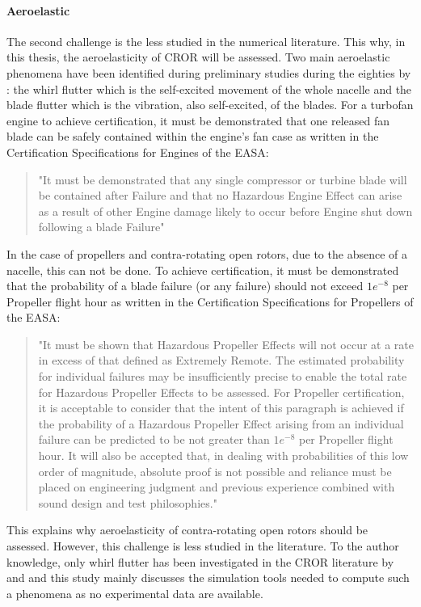 \paragraph{Aeroelastic}
The second challenge is the less studied in the numerical literature.
This why, in this thesis, the aeroelasticity of CROR will be assessed.
Two main aeroelastic phenomena have been identified during preliminary studies
during the eighties by \citet{Hager1988}: the whirl flutter which is the self-excited
movement of the whole nacelle and the blade flutter which is the vibration, also
self-excited, of the blades.
For a turbofan engine to achieve certification, it must be demonstrated that one released fan blade can be safely contained within the engine’s fan case as written in the 
Certification Specifications for Engines of the EASA:
\begin{quote}
	"It must be demonstrated that any single compressor or turbine blade will be contained after Failure and 
that no Hazardous Engine Effect can arise as a result of other Engine damage likely to occur before 
Engine shut down following a blade Failure"
\end{quote}
In the case of propellers and contra-rotating open rotors, due to the absence of a nacelle,
this can not be done. To achieve certification, it must be demonstrated that the probability of a blade
failure (or any failure) should not exceed $1e^{-8}$ per Propeller flight hour as written in 
the Certification Specifications for Propellers of the EASA:
\begin{quote}
	"It must be shown that Hazardous Propeller Effects will not occur at a rate in excess of that defined 
as Extremely Remote. The estimated probability for individual failures may be insufficiently precise 
to enable the total rate for Hazardous Propeller Effects to be assessed. For Propeller certification, it 
is acceptable to consider that the intent of this paragraph is achieved if the probability of a 
Hazardous Propeller Effect arising from an individual failure can be predicted to be not greater than 
$1e^{-8}$ per Propeller flight hour. It will also be accepted that, in dealing with probabilities of this low 
order of magnitude, absolute proof is not possible and reliance must be placed on engineering 
judgment and previous experience combined with sound design and test philosophies." 
\end{quote}
This explains why aeroelasticity of contra-rotating open rotors should be assessed.
However, this challenge is less studied in the literature.
To the author knowledge, only whirl flutter has been investigated
in the CROR literature by \citet{CISicot2011a} and \citet{Verley2013} and this study mainly
discusses the simulation tools needed to compute such a phenomena as
no experimental data are available.
